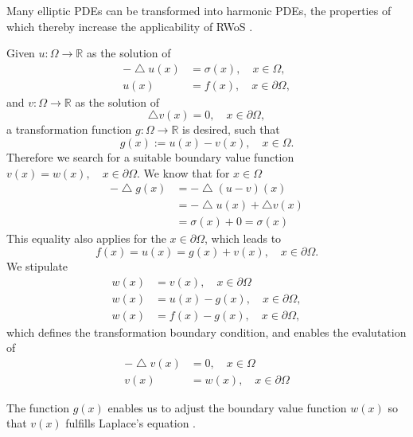    Many elliptic \glspl{PDE} can be transformed into harmonic \glspl{PDE},
the properties of which thereby increase the applicability of \gls{RWoS} \cite{Bornemann}.
\newpage
\begin{example}
Given $u:\Omega \rightarrow \mathbb{R}$ as the solution of
\begin{equation}
  \begin{aligned}
  - \bigtriangleup u(x) &= \sigma(x), \quad x \in \Omega,
  \\ u(x) &= f(x), \quad x \in \partial \Omega,
\end{aligned}
\end{equation}
and $v:\Omega \rightarrow \mathbb{R}$ as the solution of
\begin{equation}
  \bigtriangleup v(x) = 0,\quad x\in\partial\Omega,
\end{equation}
a transformation function $g:\Omega \rightarrow \mathbb{R}$ is desired, such that
\begin{equation}
  g(x):=u(x)-v(x), \quad x \in \Omega.
\end{equation}
Therefore we search for a suitable boundary value function $v(x) = w(x), \quad x \in \partial \Omega$.
We know that for $x \in \Omega$
\begin{equation}
  \begin{aligned}
- \bigtriangleup g(x) &= - \bigtriangleup (u-v)(x) \\
&= - \bigtriangleup u(x) + \bigtriangleup v(x)
\\&= \sigma(x) + 0 = \sigma(x)
\end{aligned}
\end{equation}
This equality also applies for the $x \in \partial \Omega$, which leads to
\begin{equation}
f(x) = u(x) = g(x) + v(x), \quad x \in \partial \Omega.
\end{equation}
We stipulate
\begin{equation}
\begin{aligned}
  w(x) &= v(x), \quad x \in \partial \Omega\\
  w(x) &= u(x) - g(x) , \quad x \in \partial \Omega,\\
  w(x) &= f(x) - g(x) , \quad x \in \partial \Omega,
\end{aligned}
\end{equation}
which defines the transformation boundary condition, and enables the evalutation of
\begin{equation}
  \begin{aligned}
  -\bigtriangleup v(x) &= 0, \quad x \in \Omega\\
  v(x)&=w(x), \quad x \in \partial \Omega
\end{aligned}
\end{equation}

The function $g(x)$  enables us to adjust the boundary value function $w(x)$
so that $v(x)$ fulfills Laplace's equation
\cite{Bornemann}.


\end{example}
